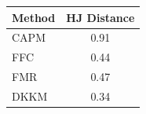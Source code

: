\begin{tabular}{l c}
\toprule
Method & HJ Distance \\
\midrule
CAPM & 0.91 \\
FFC & 0.44 \\
FMR & 0.47 \\
DKKM & 0.34 \\
\bottomrule
\end{tabular}